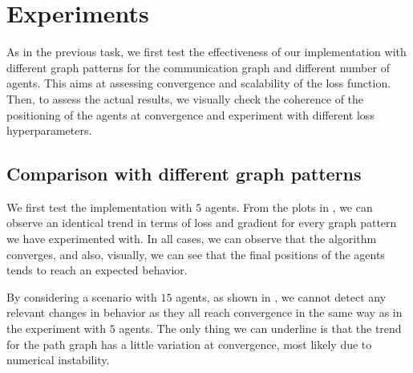 \documentclass[a4paper,11pt,oneside]{book}
\begin{document}
\section{Experiments}

As in the previous task, we first test the effectiveness of our implementation with different graph patterns for the communication graph and different number of agents. This aims at assessing convergence and scalability of the loss function. Then, to assess the actual results, we visually check the coherence of the positioning of the agents at convergence and experiment with different loss hyperparameters.


\subsection{Comparison with different graph patterns}

We first test the implementation with $5$ agents. From the plots in , we can observe an identical trend in terms of loss and gradient for every graph pattern we have experimented with. In all cases, we can observe that the algorithm converges, and also, visually, we can see that the final positions of the agents tends to reach an expected behavior.

By considering a scenario with $15$ agents, as shown in , we cannot detect any relevant changes in behavior as they all reach convergence in the same way as in the experiment with $5$ agents. The only thing we can underline is that the trend for the path graph has a little variation at convergence, most likely due to numerical instability.
\end{document}
